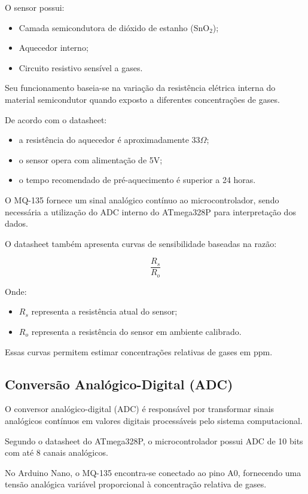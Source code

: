 \documentclass[a4paper,12pt]{article}
\begin{document}
O sensor possui:
\begin{itemize}
    \item Camada semicondutora de dióxido de estanho (SnO$_2$);
    \item Aquecedor interno;
    \item Circuito resistivo sensível a gases.
\end{itemize}

Seu funcionamento baseia-se na variação da resistência elétrica interna do material semicondutor quando exposto a diferentes concentrações de gases.

De acordo com o datasheet:
\begin{itemize}
    \item a resistência do aquecedor é aproximadamente 33$\Omega$;
    \item o sensor opera com alimentação de 5V;
    \item o tempo recomendado de pré-aquecimento é superior a 24 horas.
\end{itemize}

O MQ-135 fornece um sinal analógico contínuo ao microcontrolador, sendo necessária a utilização do ADC interno do ATmega328P para interpretação dos dados.

O datasheet também apresenta curvas de sensibilidade baseadas na razão:

\[
\frac{R_s}{R_o}
\]

Onde:
\begin{itemize}
    \item $R_s$ representa a resistência atual do sensor;
    \item $R_o$ representa a resistência do sensor em ambiente calibrado.
\end{itemize}

Essas curvas permitem estimar concentrações relativas de gases em ppm.

\subsection{Conversão Analógico-Digital (ADC)}

O conversor analógico-digital (ADC) é responsável por transformar sinais analógicos contínuos em valores digitais processáveis pelo sistema computacional.

Segundo o datasheet do ATmega328P, o microcontrolador possui ADC de 10 bits com até 8 canais analógicos.

No Arduino Nano, o MQ-135 encontra-se conectado ao pino A0, fornecendo uma tensão analógica variável proporcional à concentração relativa de gases.
\end{document}
